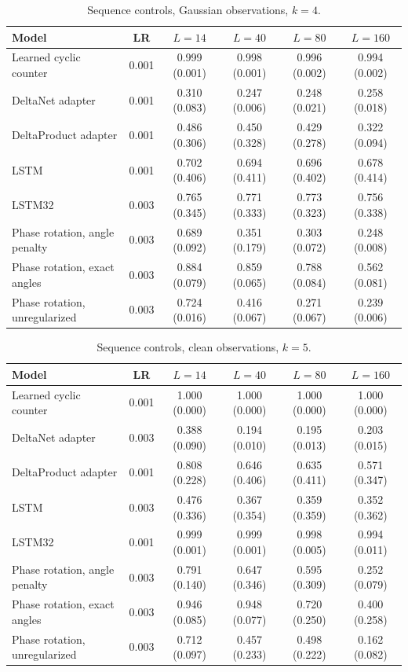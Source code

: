 \begin{table}[tbp]
\centering\small
\caption{Sequence controls, Gaussian observations, $k=4$.}
\label{tab:newseq4}
\setlength{\tabcolsep}{3pt}
\begin{tabular}{lccccc}
\toprule
Model & LR & $L=14$ & $L=40$ & $L=80$ & $L=160$ \\
\midrule
Learned cyclic counter & 0.001 & 0.999 (0.001) & 0.998 (0.001) & 0.996 (0.002) & 0.994 (0.002) \\
DeltaNet adapter & 0.001 & 0.310 (0.083) & 0.247 (0.006) & 0.248 (0.021) & 0.258 (0.018) \\
DeltaProduct adapter & 0.001 & 0.486 (0.306) & 0.450 (0.328) & 0.429 (0.278) & 0.322 (0.094) \\
LSTM & 0.001 & 0.702 (0.406) & 0.694 (0.411) & 0.696 (0.402) & 0.678 (0.414) \\
LSTM32 & 0.003 & 0.765 (0.345) & 0.771 (0.333) & 0.773 (0.323) & 0.756 (0.338) \\
Phase rotation, angle penalty & 0.003 & 0.689 (0.092) & 0.351 (0.179) & 0.303 (0.072) & 0.248 (0.008) \\
Phase rotation, exact angles & 0.003 & 0.884 (0.079) & 0.859 (0.065) & 0.788 (0.084) & 0.562 (0.081) \\
Phase rotation, unregularized & 0.003 & 0.724 (0.016) & 0.416 (0.067) & 0.271 (0.067) & 0.239 (0.006) \\
\bottomrule
\end{tabular}
\end{table}

\begin{table}[tbp]
\centering\small
\caption{Sequence controls, clean observations, $k=5$.}
\label{tab:newseq5}
\setlength{\tabcolsep}{3pt}
\begin{tabular}{lccccc}
\toprule
Model & LR & $L=14$ & $L=40$ & $L=80$ & $L=160$ \\
\midrule
Learned cyclic counter & 0.001 & 1.000 (0.000) & 1.000 (0.000) & 1.000 (0.000) & 1.000 (0.000) \\
DeltaNet adapter & 0.003 & 0.388 (0.090) & 0.194 (0.010) & 0.195 (0.013) & 0.203 (0.015) \\
DeltaProduct adapter & 0.001 & 0.808 (0.228) & 0.646 (0.406) & 0.635 (0.411) & 0.571 (0.347) \\
LSTM & 0.003 & 0.476 (0.336) & 0.367 (0.354) & 0.359 (0.359) & 0.352 (0.362) \\
LSTM32 & 0.001 & 0.999 (0.001) & 0.999 (0.001) & 0.998 (0.005) & 0.994 (0.011) \\
Phase rotation, angle penalty & 0.003 & 0.791 (0.140) & 0.647 (0.346) & 0.595 (0.309) & 0.252 (0.079) \\
Phase rotation, exact angles & 0.003 & 0.946 (0.085) & 0.948 (0.077) & 0.720 (0.250) & 0.400 (0.258) \\
Phase rotation, unregularized & 0.003 & 0.712 (0.097) & 0.457 (0.233) & 0.498 (0.222) & 0.162 (0.082) \\
\bottomrule
\end{tabular}
\end{table}


